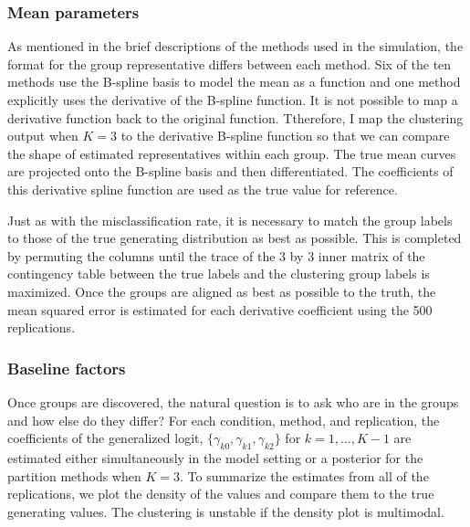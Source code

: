 \subsubsection{Mean parameters}
As mentioned in the brief descriptions of the methods used in the simulation, the format for the group representative differs between each method. Six of the ten methods use the B-spline basis to model the mean as a function and one method explicitly uses the derivative of the B-spline function. It is not possible to map a derivative function back to the original function. Ttherefore, I map the clustering output when $K=3$ to the derivative B-spline function so that we can compare the shape of estimated representatives within each group. The true mean curves are projected onto the B-spline basis and then differentiated. The coefficients of this derivative spline function are used as the true value for reference. 

Just as with the misclassification rate, it is necessary to match the group labels to those of the true generating distribution as best as possible. This is completed by permuting the columns until the trace of the 3 by 3 inner matrix of the contingency table between the true labels and the clustering group labels is maximized. Once the groups are aligned as best as possible to the truth, the mean squared error is estimated for each derivative coefficient using the 500 replications.

\subsubsection{Baseline factors}
Once groups are discovered, the natural question is to ask who are in the groups and how else do they differ? For each condition, method, and replication, the coefficients of the generalized logit, $\{\gamma_{k0},\gamma_{k1},\gamma_{k2}\}$ for $k=1,...,K-1$ are estimated either simultaneously in the model setting or a posterior for the partition methods when $K=3$. To summarize the estimates from all of the replications, we plot the density of the values and compare them to the true generating values. The clustering is unstable if the density plot is multimodal.

